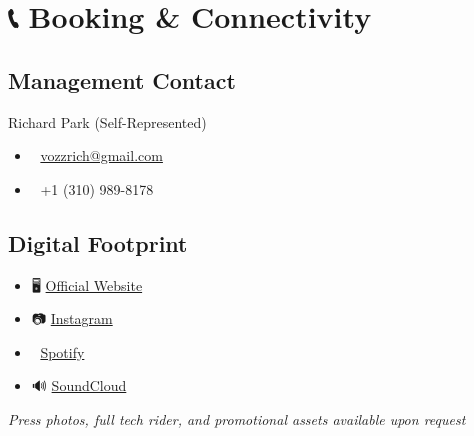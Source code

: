 \documentclass{article}
\newcommand{\subsectionrule}{\par\noindent{\color{secondary!15}\rule{\textwidth}{0.5pt}}\vspace{-1em}}
\begin{document}
\section*{\color{primary}📞 Booking \& Connectivity}
\subsectionrule
\subsection*{Management Contact}
Richard Park (Self-Represented)
\begin{itemize}
\item 📧 \href{mailto:vozzrich@gmail.com}{vozzrich@gmail.com}
\item 📱 +1 (310) 989-8178
\end{itemize}

\subsection*{Digital Footprint}
\begin{itemize}
\item 🖥️ \href{https://vozzrich.com}{Official Website}
\item 📷 \href{https://instagram.com/vozzrich}{Instagram}
\item 🎵 \href{https://open.spotify.com/artist/27sSKrytmUXukDnMGPXNHQ}{Spotify}
\item 🔊 \href{https://soundcloud.com/vozzrich}{SoundCloud}
\end{itemize}

\begin{center}
\small\itshape\color{primary!50}Press photos, full tech rider, and promotional assets available upon request
\end{center}
\end{document}
